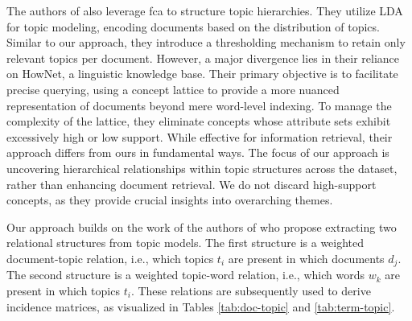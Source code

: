 The authors of \cite{wang_topic_hierarchy_2023} also leverage \ac{fca} to structure topic hierarchies.
They utilize LDA for topic modeling, encoding documents based on the distribution of topics.
Similar to our approach, they introduce a thresholding mechanism to retain only relevant topics per document.
However, a major divergence lies in their reliance on HowNet, a linguistic knowledge base.
Their primary objective is to facilitate precise querying,
using a concept lattice to provide a more nuanced representation of documents beyond mere word-level indexing.
To manage the complexity of the lattice, they eliminate concepts whose attribute sets exhibit excessively high or low support.
While effective for information retrieval, their approach differs from ours in fundamental ways.
The focus of our approach is uncovering hierarchical relationships within topic structures across the dataset,
rather than enhancing document retrieval.
We do not discard high-support concepts,
as they provide crucial insights into overarching themes.

Our approach builds on the work of the authors of \cite{angelov_topic_modeling_2024} who propose extracting two relational structures from topic models.
The first structure is a weighted document-topic relation, i.e., which topics $t_i$ are present in which documents $d_j$.
The second structure is a weighted topic-word relation, i.e., which words $w_k$ are present in which topics $t_i$.
These relations are subsequently used to derive incidence matrices,
as visualized in Tables \ref{tab:doc-topic} and \ref{tab:term-topic}.

